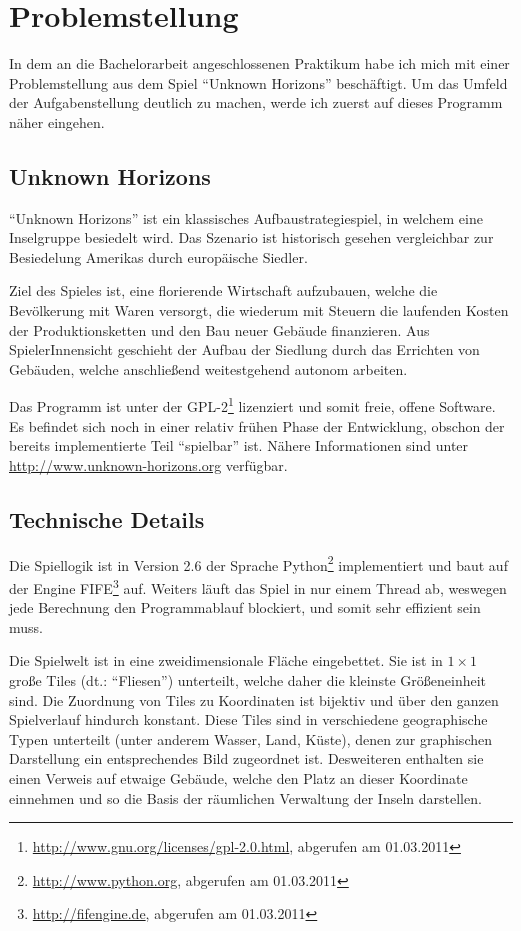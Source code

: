 \documentclass[%
			paper=a4,%
			DIV12,
			liststotoc,
			bibtotoc,
			draft=false,%
			titlepage,
			numbers=noendperiod
			]{scrartcl}
\newcommand{\footurl}[2]{\footnote{\url{#1}, abgerufen am #2}}
\begin{document}
\section{Problemstellung}

In dem an die Bachelorarbeit angeschlossenen Praktikum habe ich mich mit einer Problemstellung aus dem Spiel "`Unknown Horizons"' beschäftigt.
Um das Umfeld der Aufgabenstellung deutlich zu machen, werde ich zuerst auf dieses Programm näher eingehen.

\subsection{Unknown Horizons}
"`Unknown Horizons"' ist ein klassisches Aufbaustrategiespiel, in welchem eine Inselgruppe besiedelt wird. 
Das Szenario ist historisch gesehen vergleichbar zur Besiedelung Amerikas durch europäische Siedler.

Ziel des Spieles ist, eine florierende Wirtschaft aufzubauen, welche die Bevölkerung mit Waren versorgt, die wiederum mit Steuern die laufenden Kosten der Produktionsketten und den Bau neuer Gebäude finanzieren.
Aus SpielerInnensicht geschieht der Aufbau der Siedlung durch das Errichten von Gebäuden, welche anschließend weitestgehend autonom arbeiten.

Das Programm ist unter der GPL-2\footurl{http://www.gnu.org/licenses/gpl-2.0.html}{01.03.2011} lizenziert und somit freie, offene Software. 
Es befindet sich noch in einer relativ frühen Phase der Entwicklung, obschon der bereits implementierte Teil "`spielbar"' ist.
Nähere Informationen sind unter \url{http://www.unknown-horizons.org} verfügbar.

\subsection{Technische Details}

Die Spiellogik ist in Version 2.6 der Sprache Python\footurl{http://www.python.org}{01.03.2011} implementiert und
baut auf der Engine FIFE\footurl{http://fifengine.de}{01.03.2011} auf.
Weiters läuft das Spiel in nur einem Thread ab, weswegen jede Berechnung den Programmablauf blockiert, und somit sehr effizient sein muss.

Die Spielwelt ist in eine zweidimensionale Fläche eingebettet.
Sie ist in $1\times1$ große Tiles (dt.: "`Fliesen"') unterteilt, welche daher die kleinste Größeneinheit sind. 
Die Zuordnung von Tiles zu Koordinaten ist bijektiv und über den ganzen Spielverlauf hindurch konstant.
Diese Tiles sind in verschiedene geographische Typen unterteilt (unter anderem Wasser, Land, Küste), denen zur graphischen Darstellung ein entsprechendes Bild zugeordnet ist.
Desweiteren enthalten sie einen Verweis auf etwaige Gebäude, welche den Platz an dieser Koordinate einnehmen und so die Basis der räumlichen Verwaltung der Inseln darstellen.
\end{document}
